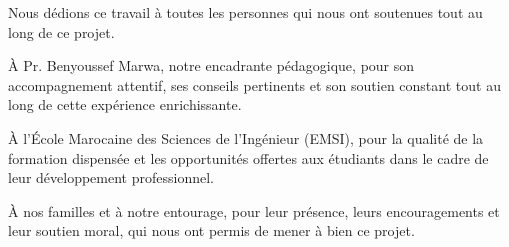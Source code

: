 \setlength{\parskip}{1em}
Nous dédions ce travail à toutes les personnes qui nous ont soutenues tout au long de ce projet.

À Pr. Benyoussef Marwa, notre encadrante pédagogique, pour son accompagnement attentif, ses conseils pertinents et son soutien constant tout au long de cette expérience enrichissante.

À l'École Marocaine des Sciences de l'Ingénieur (EMSI), pour la qualité de la formation dispensée et les opportunités offertes aux étudiants dans le cadre de leur développement professionnel.

À nos familles et à notre entourage, pour leur présence, leurs encouragements et leur soutien moral, qui nous ont permis de mener à bien ce projet.
